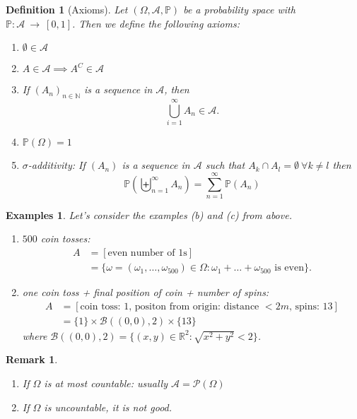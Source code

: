 \documentclass[a4paper]{article}
\newtheorem*{defi*}{Definition}
\newtheorem*{rem}{Remark}
\newtheorem*{exs}{Examples}
\newcommand{\N}{\mathbb{N}}
\newcommand{\PP}{\mathbb{P}}
\newcommand{\R}{\mathbb{R}}
\begin{document}
\begin{defi*}[Axioms]
  Let $(\Omega,\mathcal{A},\PP)$ be a probability space with $\PP:\mathcal{A}~\to~[0,1]$. 
  Then we define the following axioms:
  \begin{enumerate}
    \item $\emptyset \in \mathcal{A}$
    \item $A \in \mathcal{A} \implies A^C \in \mathcal{A}$
    \item If $(A_n)_{n \in \N}$ is a sequence in $\mathcal{A}$, then 
    \[ \bigcup_{i=1}^\infty A_n \in \mathcal{A} \text{.} \]
    \item $\PP(\Omega) = 1$
    \item $\sigma$-additivity: If $(A_n)$ is a sequence in $\mathcal{A}$ such that
    $A_k \cap A_l = \emptyset \: \forall k \neq l$ then
    \[ \PP(\biguplus_{n=1}^\infty A_n) = \sum_{n=1}^\infty \PP(A_n) \]
  \end{enumerate}
\end{defi*}

\begin{exs}
  Let's consider the examples (b) and (c) from above.
  \begin{enumerate}[label=(\alph*)]
    \item[(b)] $500$ coin tosses:
    \begin{align*}
      A &= [ \text{even number of $1$s} ] \\
      &= \{ \omega = (\omega_1,\dots,\omega_{500}) \in \Omega: \omega_1 + \dots + \omega_{500} \text{ is even} \} \text{.}
    \end{align*}
    \item[(c)] one coin toss + final position of coin + number of spins:
    \begin{align*}
      A &= [ \text{coin toss: } 1 \text{, positon from origin: distance } < 2m \text{, spins: } 13 ] \\
      &= \{ 1 \} \times \mathcal{B}((0,0),2) \times \{13\}
    \end{align*}
    where $\mathcal{B}((0,0),2) = \{(x,y) \in \R^2: \sqrt{x^2 + y^2} < 2 \}$.
  \end{enumerate}
\end{exs}

\begin{rem}  
  \begin{enumerate}
    \item If $\Omega$ is at most countable: usually $\mathcal{A} = \mathcal{P}(\Omega)$
    \item If $\Omega$ is uncountable, it is not good.
  \end{enumerate}
\end{rem}
\end{document}
